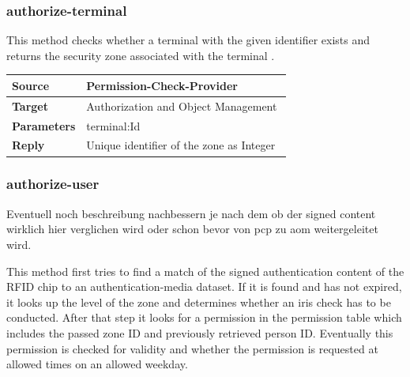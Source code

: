 \documentclass[12pt,a4paper,titlepage,oneside]{scrartcl}
\begin{document}
\subsubsection{authorize-terminal}

This method checks whether a terminal with the given identifier exists and returns the security zone associated with the terminal .

\begin{table}[h]

    \centering

    \begin{tabular}{|l|p{12cm}|} \hline

    \textbf{Source}&Permission-Check-Provider\\ \hline

    \textbf{Target}&Authorization and Object Management\\ \hline

    \textbf{Parameters}& terminal:Id\\ \hline

    \textbf{Reply}&Unique identifier of the zone as Integer\ \hline

    \end{tabular}

\end{table}

\subsubsection{authorize-user}

Eventuell noch beschreibung nachbessern je nach dem ob der signed content wirklich hier verglichen wird oder schon bevor von pcp zu aom weitergeleitet wird.

This method first tries to find a match of the signed authentication content of the RFID chip to an authentication-media dataset. If it is found and has not expired, it looks up the level of the zone and determines whether an iris check has to be conducted. After that step it looks for a permission in the permission table which includes the passed zone ID and previously retrieved person ID. Eventually this permission is checked for validity and whether the permission is requested at allowed times on an allowed weekday.
\end{document}

